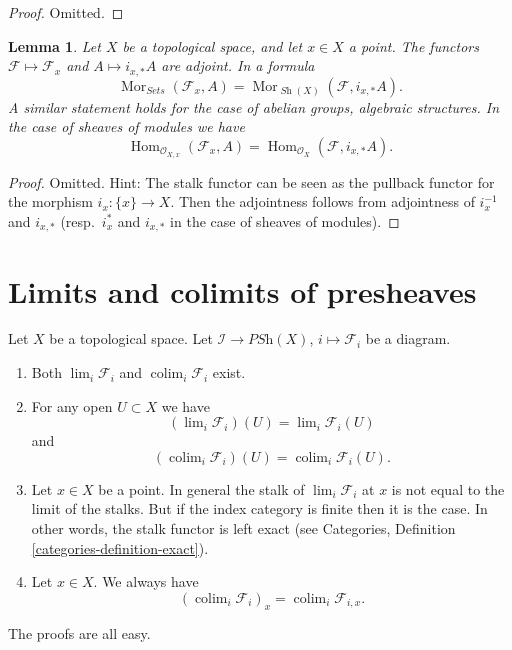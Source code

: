 \documentclass{stacks-project}
\theoremstyle{plain}
\newtheorem{lemma}[subsection]{Lemma}
\theoremstyle{definition}
\theoremstyle{remark}
\numberwithin{equation}{subsection}
\def\lim{\mathop{\mathrm{lim}}\nolimits}
\def\colim{\mathop{\mathrm{colim}}\nolimits}
\def\Hom{\mathop{\mathrm{Hom}}\nolimits}
\def\Mor{\mathop{\mathrm{Mor}}\nolimits}
\def\Sh{\mathop{\mathit{Sh}}\nolimits}
\begin{document}
\begin{proof}
Omitted.
\end{proof}

\begin{lemma}
\label{lemma-stalk-skyscraper-adjoint}
Let $X$ be a topological space, and let $x \in X$ a point.
The functors $\mathcal{F} \mapsto \mathcal{F}_x$ and
$A \mapsto i_{x, *}A$ are adjoint. In a formula
$$
\Mor_{\textit{Sets}}(\mathcal{F}_x, A)
=
\Mor_{\Sh(X)}(\mathcal{F}, i_{x, *}A).
$$
A similar statement holds for the case of
abelian groups, algebraic structures. In the case of
sheaves of modules we have
$$
\Hom_{\mathcal{O}_{X, x}}(\mathcal{F}_x, A)
=
\Hom_{\mathcal{O}_X}(\mathcal{F}, i_{x, *}A).
$$
\end{lemma}

\begin{proof}
Omitted. Hint: The stalk functor can be
seen as the pullback functor for the morphism $i_x : \{x\} \to X$.
Then the adjointness follows from adjointness of
$i_x^{-1}$ and $i_{x, *}$ (resp.\ $i_x^*$ and $i_{x, *}$
in the case of sheaves of modules).
\end{proof}









\section{Limits and colimits of presheaves}
\label{section-limits-presheaves}

\noindent
Let $X$ be a topological space.
Let $\mathcal{I} \to \textit{PSh}(X)$, $i \mapsto \mathcal{F}_i$
be a diagram.
\begin{enumerate}
\item Both $\lim_i \mathcal{F}_i$ and $\colim_i \mathcal{F}_i$
exist.
\item For any open $U \subset X$ we have
$$
(\lim_i \mathcal{F}_i)(U) =
\lim_i \mathcal{F}_i(U)
$$
and
$$
(\colim_i \mathcal{F}_i)(U) =
\colim_i \mathcal{F}_i(U).
$$
\item Let $x \in X$ be a point. In general the stalk of
$\lim_i \mathcal{F}_i$ at $x$ is not equal to
the limit of the stalks. But if the index category is finite
then it is the case. In other words, the stalk functor is
left exact (see Categories, Definition \ref{categories-definition-exact}).
\item Let $x \in X$. We always have
$$
(\colim_i \mathcal{F}_i)_x =
\colim_i \mathcal{F}_{i, x}.
$$
\end{enumerate}
The proofs are all easy.
\end{document}
